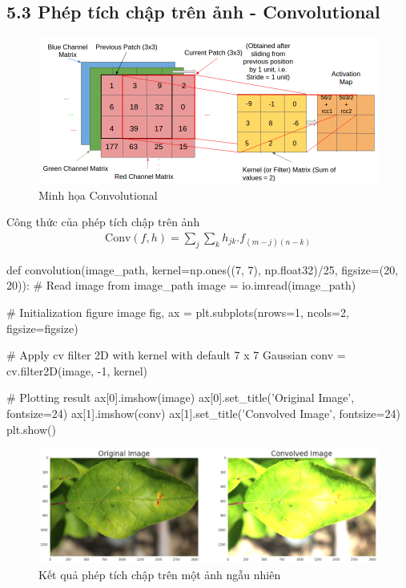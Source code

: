 \documentclass{article}
\begin{document}
	\subsection{5.3 Phép tích chập trên ảnh - Convolutional}
	\begin{figure}[H]
		\centering
		\includegraphics[width=1\linewidth]{architecture/convolution.png}
		\caption{Minh họa Convolutional}
		\label{fig:writing-thesis}
	\end{figure}
	Công thức của phép tích chập trên ảnh
	\begin{align*}
	\text{Conv}(f, h) = \sum_{j}\sum_{k}h_{jk}.f_{(m-j)(n-k)}
	\end{align*}
	\begin{python}
		def convolution(image_path, kernel=np.ones((7, 7), np.float32)/25, figsize=(20, 20)):
			# Read image from image_path
			image = io.imread(image_path)
			
			# Initialization figure image
			fig, ax = plt.subplots(nrows=1, ncols=2, figsize=figsize)
			
			# Apply cv filter 2D with kernel with default 7 x 7 Gaussian
			conv = cv.filter2D(image, -1, kernel)
			
			# Plotting result
			ax[0].imshow(image)
			ax[0].set_title('Original Image', fontsize=24)
			ax[1].imshow(conv)
			ax[1].set_title('Convolved Image', fontsize=24)
			plt.show()
	\end{python}
	\begin{figure}[H]
		\centering
		\includegraphics[width=1\linewidth]{images/conv.png}
		\caption{Kết quả phép tích chập trên một ảnh ngẫu nhiên}
		\label{fig:writing-thesis}
	\end{figure}
\end{document}
